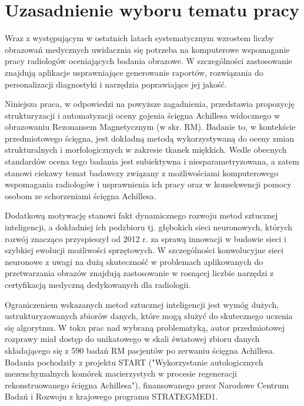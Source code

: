 {\let\clearpage\relax\chapter*{Uzasadnienie wyboru tematu pracy}}

Wraz z występującym w ostatnich latach systematycznym wzrostem liczby obrazowań medycznych uwidacznia się potrzeba na komputerowe wspomaganie pracy radiologów oceniających badania obrazowe. W szczególności zastosowanie znajdują aplikacje usprawniające generowanie raportów, rozwiązania do personalizacji diagnostyki i narzędzia poprawiające jej jakość.

Niniejsza praca, w odpowiedzi na powyższe zagadnienia, przedstawia propozycję strukturyzacji i automatyzacji oceny gojenia ścięgna Achillesa widocznego w obrazowaniu Rezonansem Magnetycznym (w skr. RM). Badanie to, w kontekście przedmiotowego ścięgna, jest dokładną metodą wykorzystywaną do oceny zmian strukturalnych i morfologicznych w zakresie tkanek miękkich. Wedle obecnych standardów ocena tego badania jest subiektywna i niesparametryzowana, a zatem stanowi ciekawy temat badawczy związany z możliwościami komputerowego wspomagania radiologów i usprawnienia ich pracy oraz w konsekwencji pomocy osobom ze schorzeniami ścięgna Achillesa.

Dodatkową motywację stanowi fakt dynamicznego rozwoju metod sztucznej inteligencji, a dokładniej ich podzbioru tj. głębokich sieci neuronowych, których rozwój znacząco przyspieszył od 2012 r. za sprawą innowacji w budowie sieci i szybkiej ewolucji możliwości sprzętowych. W szczególności konwolucyjne sieci neuronowe z uwagi na dużą skuteczność w problemach aplikowanych do przetwarzania obrazów znajdują zastosowanie w rosnącej liczbie narzędzi z certyfikacją medyczną dedykowanych dla radiologii.

Ograniczeniem wskazanych metod sztucznej inteligencji jest wymóg dużych, ustrukturyzowanych zbiorów danych, które mogą służyć do skutecznego uczenia się algorytmu. W toku prac nad wybraną problematyką, autor przedmiotowej rozprawy miał dostęp do unikatowego w skali światowej zbioru danych składającego się z 590 badań RM pacjentów po zerwaniu ścięgna Achillesa. Badania pochodziły z projektu START ("Wykorzystanie autologicznych mezenchymalnych komórek macierzystych w procesie regeneracji rekonstruowanego ścięgna Achillesa"), finansowanego przez Narodowe Centrum Badań i Rozwoju z krajowego programu STRATEGMED1.

